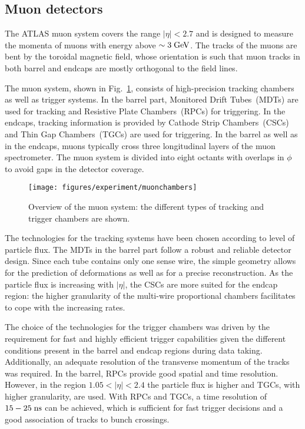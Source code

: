 \subsection{Muon detectors}
\label{sec:muonspectrometer}

The ATLAS muon system covers the range \mbox{$|\eta| < 2.7$}
and is designed to measure the momenta of muons with energy 
above \mbox{$\sim 3 \; \mathrm{GeV}$}.
The tracks of the muons are bent by the toroidal magnetic field,
whose orientation is such that muon tracks in both barrel and endcaps 
are mostly orthogonal to the field lines.

The muon system, shown in Fig.~\ref{fig:muons}, consists of high-precision tracking chambers as well as trigger systems.
In the barrel part, Monitored Drift Tubes~(MDTs) are used for tracking and Resistive Plate Chambers~(RPCs) for triggering.
In the endcaps, tracking information is provided by Cathode Strip Chambers~(CSCs) and Thin Gap Chambers~(TGCs) are used for triggering.
In the barrel as well as in the endcaps, muons typically cross three longitudinal layers of the muon spectrometer.
The muon system is divided into eight octants with overlaps in $\phi$ to avoid gaps in the detector coverage.

\begin{figure}[h]
\begin{center}
\texttt{[image: figures/experiment/muonchambers]}
\caption[Overview of the muon system]{
  Overview of the muon system:
  the different types of tracking and trigger chambers are shown.}
\label{fig:muons}
\end{center}
\end{figure}

The technologies for the tracking systems have been chosen according to
level of particle flux.
The MDTs in the barrel part follow a robust and reliable detector design.
Since each tube contains only one sense wire, the simple geometry
allows for the prediction of deformations as well as for a precise reconstruction.
As the particle flux is increasing with $|\eta|$, 
the CSCs are more suited for the endcap region:
the higher granularity of the multi-wire proportional chambers 
facilitates to cope with the increasing rates.

The choice of the technologies for the trigger chambers was driven 
by the requirement for fast and highly efficient trigger capabilities
given the different conditions present in the barrel and endcap regions during data taking.
Additionally, an adequate resolution of the transverse momentum of the tracks was required.
In the barrel, RPCs provide good spatial and time resolution.
However, in the region \mbox{$1.05 < |\eta| < 2.4$}  the particle flux
is higher and TGCs, with higher granularity, are used.
With RPCs and TGCs, a time resolution of \mbox{$15 - 25 \; \mathrm{ns}$} can be
achieved, 
which is sufficient for fast trigger decisions and a good association of
tracks to bunch crossings.

